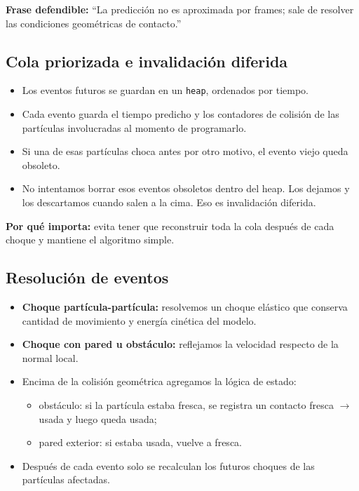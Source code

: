 \documentclass[11pt]{article}
\begin{document}
\textbf{Frase defendible:} ``La predicci\'on no es aproximada por frames; sale de resolver las condiciones geom\'etricas de contacto.''

\subsection{Cola priorizada e invalidaci\'on diferida}

\begin{itemize}
  \item Los eventos futuros se guardan en un \texttt{heap}, ordenados por tiempo.
  \item Cada evento guarda el tiempo predicho y los contadores de colisi\'on de las part\'iculas involucradas al momento de programarlo.
  \item Si una de esas part\'iculas choca antes por otro motivo, el evento viejo queda obsoleto.
  \item No intentamos borrar esos eventos obsoletos dentro del heap. Los dejamos y los descartamos cuando salen a la cima. Eso es invalidaci\'on diferida.
\end{itemize}

\textbf{Por qu\'e importa:} evita tener que reconstruir toda la cola despu\'es de cada choque y mantiene el algoritmo simple.

\subsection{Resoluci\'on de eventos}

\begin{itemize}
  \item \textbf{Choque part\'icula-part\'icula:} resolvemos un choque el\'astico que conserva cantidad de movimiento y energ\'ia cin\'etica del modelo.
  \item \textbf{Choque con pared u obst\'aculo:} reflejamos la velocidad respecto de la normal local.
  \item Encima de la colisi\'on geom\'etrica agregamos la l\'ogica de estado:
    \begin{itemize}
      \item obst\'aculo: si la part\'icula estaba fresca, se registra un contacto fresca $\rightarrow$ usada y luego queda usada;
      \item pared exterior: si estaba usada, vuelve a fresca.
    \end{itemize}
  \item Despu\'es de cada evento solo se recalculan los futuros choques de las part\'iculas afectadas.
\end{itemize}
\end{document}
